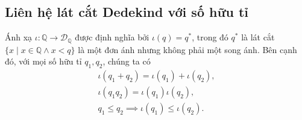 \subsection{Liên hệ lát cắt Dedekind với số hữu tỉ}

\begin{theorem}
    Ánh xạ $\iota: \mathbb{Q}\to \mathscr{D}_{\mathbb{Q}}$ được định nghĩa bởi $\iota(q) = q^{*}$, trong đó $q^{*}$ là lát cắt $\{ x \mid x\in\mathbb{Q} \wedge x < q \}$ là một đơn ánh nhưng không phải một song ánh. Bên cạnh đó, với mọi số hữu tỉ $q_{1}, q_{2}$, chúng ta có
    \[
        \begin{split}
            \iota(q_{1} + q_{2}) = \iota(q_{1}) + \iota(q_{2}), \\
            \iota(q_{1}q_{2}) = \iota(q_{1})\iota(q_{2}), \\
            q_{1}\leq q_{2} \implies \iota(q_{1})\leq \iota(q_{2}).
        \end{split}
    \]
\end{theorem}

